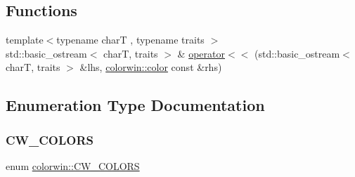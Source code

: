\subsection*{Functions}
\begin{DoxyCompactItemize}
\item 
{\footnotesize template$<$typename charT , typename traits $>$ }\\std\+::basic\+\_\+ostream$<$ charT, traits $>$ \& \hyperlink{namespacecolorwin_a887076b426f30e7ef603bc5eab7d3c2a}{operator$<$$<$} (std\+::basic\+\_\+ostream$<$ charT, traits $>$ \&lhs, \hyperlink{classcolorwin_1_1color}{colorwin\+::color} const \&rhs)
\end{DoxyCompactItemize}


\subsection{Enumeration Type Documentation}
\mbox{\label{namespacecolorwin_a9c26d66eac71ba049d125e59a63e95d4}} 
\subsubsection{\texorpdfstring{C\+W\+\_\+\+C\+O\+L\+O\+RS}{CW\_COLORS}}
{\footnotesize\ttfamily enum \hyperlink{namespacecolorwin_a9c26d66eac71ba049d125e59a63e95d4}{colorwin\+::\+C\+W\+\_\+\+C\+O\+L\+O\+RS}}

